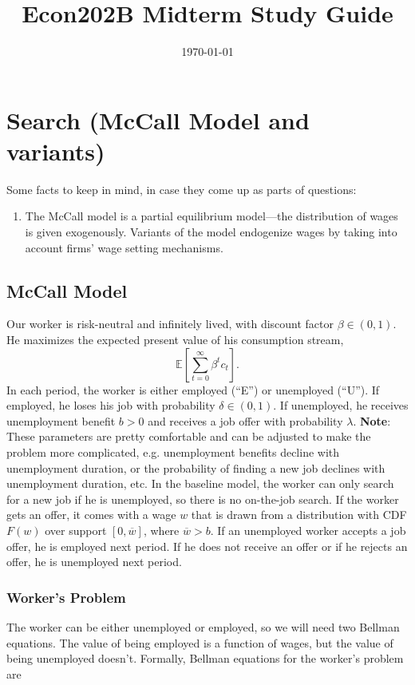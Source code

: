 \documentclass[11pt]{article}
\date{\today}
\title{Econ202B Midterm Study Guide}
\newcommand{\E}{\mathbb{E}}
\begin{document}
\maketitle
\tableofcontents

\newpage

\section{Search (McCall Model and variants)}
\label{sec:orgb725dc6}
Some facts to keep in mind, in case they come up as parts of questions:
\begin{enumerate}
\item The McCall model is a partial equilibrium model---the distribution of wages is given exogenously. Variants of the model endogenize wages by taking into account firms' wage setting mechanisms.
\end{enumerate}

\subsection{McCall Model}
\label{sec:orga69b0d4}
Our worker is risk-neutral and infinitely lived, with discount factor \(\beta \in (0, 1)\). He maximizes the expected present value of his consumption stream,
\[
\E\left[\sum^\infty_{t = 0} \beta^t c_t\right].
\]
In each period, the worker is either employed (``E'') or unemployed (``U''). If employed, he loses his job with probability \(\delta \in (0, 1)\). If unemployed, he receives unemployment benefit \(b > 0\) and receives a job offer with probability \(\lambda\). \textbf{Note}: These parameters are pretty comfortable and can be adjusted to make the problem more complicated, e.g. unemployment benefits decline with unemployment duration, or the probability of finding a new job declines with unemployment duration, etc. In the baseline model, the worker can only search for a new job if he is unemployed, so there is no on-the-job search. If the worker gets an offer, it comes with a wage \(w\) that is drawn from a distribution with CDF \(F(w)\) over support \([0, \overline{w}]\), where \(\overline{w}> b\). If an unemployed worker accepts a job offer, he is employed next period. If he does not receive an offer or if he rejects an offer, he is unemployed next period.

\subsubsection{Worker's Problem}
\label{sec:orga8234af}
The worker can be either unemployed or employed, so we will need two Bellman equations. The value of being employed is a function of wages, but the value of being unemployed doesn't. Formally, Bellman equations for the worker's problem are
\end{document}
